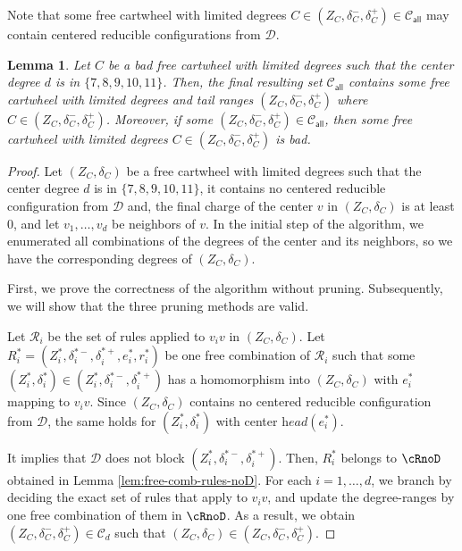 \documentclass[10pt,a4paper]{article}
\newtheorem{lem}[thm]{Lemma}
\def\head{\textit{head}}
\begin{document}
Note that some free cartwheel with limited degrees $C \in (Z_C, \delta_C^-, \delta_C^+) \in \mathcal{C}_{\textsf{all}}$ may contain centered reducible configurations from $\mathcal{D}$.

\begin{lem}
    Let $C$ be a bad free cartwheel with limited degrees such that the center degree $d$ is in $\{7,8,9,10,11\}$.
    Then, the final resulting set $\mathcal{C}_{\textsf{all}}$ contains some free cartwheel with limited degrees and tail ranges $(Z_C, \delta_C^-, \delta_C^+)$ where $C \in (Z_C, \delta_C^-, \delta_C^+)$.
    Moreover, if some $(Z_C, \delta_C^-, \delta_C^+) \in \mathcal{C}_{\textsf{all}}$, then some free cartwheel with limited degrees $C \in (Z_C, \delta_C^-, \delta_C^+)$ is bad.
\end{lem}
\begin{proof}
    Let $(Z_C, \delta_C)$ be a free cartwheel with limited degrees such that the center degree $d$ is in $\{7,8,9,10,11\}$, it contains no centered reducible configuration from $\mathcal{D}$ and, the final charge of the center $v$ in $(Z_C, \delta_C)$ is at least 0, and let $v_1,\ldots,v_{d}$ be neighbors of $v$.
    In the initial step of the algorithm, we enumerated all combinations of the degrees of the center and its neighbors, so we have the corresponding degrees of $(Z_C, \delta_C)$.

    First, we prove the correctness of the algorithm without pruning.
    Subsequently, we will show that the three pruning methods are valid.
    
    Let $\mathcal{R}_i$ be the set of rules applied to $v_iv$ in $(Z_C, \delta_C)$.
    Let $R_i^* = (Z_i^*, \delta_i^{*-}, \delta_i^{*+}, e_i^*, r_i^*)$ be one free combination of $\mathcal{R}_i$ such that
    some $(Z_i^*, \delta_i^*) \in (Z_i^*, \delta_i^{*-}, \delta_i^{*+})$ has a homomorphism into $(Z_C, \delta_C)$ with $e_i^*$ mapping to $v_iv$.
    Since $(Z_C, \delta_C)$ contains no centered reducible configuration from $\mathcal{D}$, the same holds for $(Z_i^*, \delta_i^*)$ with center $\head(e_i^*)$.
    
    It implies that $\mathcal{D}$ does not block $(Z_i^*, \delta_i^{*-}, \delta_i^{*+})$.
    Then, $R^*_i$ belongs to $\cRnoD$ obtained in Lemma \ref{lem:free-comb-rules-noD}.
    For each $i=1,\ldots,d$, we branch by deciding the exact set of rules that apply to $v_iv$, and update the degree-ranges by one free combination of them in $\cRnoD$.
    As a result, we obtain $(Z_C, \delta_C^-, \delta_C^+) \in \mathcal{C}_d$ such that $(Z_C, \delta_C) \in (Z_C, \delta_C^-, \delta_C^+)$.


\end{proof}
\end{document}
